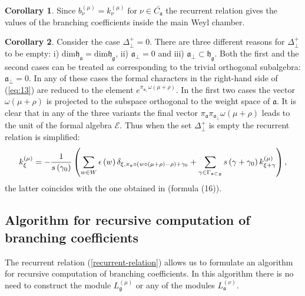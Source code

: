 \documentclass[12pt]{iopart}
\theoremstyle{definition}
\newtheorem{corollary}{Corollary}[theorem]
\theoremstyle{definition}
\theoremstyle{definition}
\begin{document}
\begin{corollary}
  Since $b^{(\mu)}_{\nu}=k^{(\mu)}_{\nu}\;\mbox{for}\;\nu\in \bar{C_{\mathfrak{a}}}$ the recurrent relation gives the values of the branching coefficients inside the main Weyl chamber.
\end{corollary}
\begin{corollary}
  Consider the case  $\Delta_{\bot}^{+} = 0$. There are three different reasons for $\Delta_{\bot}^{+}$
to be empty: i) $\mathrm{dim}\mathfrak{h}_{\mathfrak{a}}=\mathrm{dim}\mathfrak{h}_{\mathfrak{g}}$,
ii) $\mathfrak{a}_{\bot}=0$ and iii) $\mathfrak{a}_{\bot}\subset \mathfrak{h}_{\mathfrak{g}}$.
Both the first and the second cases can be treated as corresponding to the trivial orthogonal subalgebra:
$\mathfrak{a}_{\bot}=0$. In any of these cases the formal characters in the right-hand side of (\ref{eq:13})
are reduced to the element $e^{ \pi_{\mathfrak{a}_{\bot}}\omega(\mu+\rho)}$.
In the first two cases the vector $\omega(\mu+\rho)$ is projected to the subspace orthogonal to the weight space of $\mathfrak{a}$. It is clear that in any of the three variants the final vector $\pi_{\mathfrak{a}}\pi_{\mathfrak{a}_{\bot}}\omega(\mu+\rho)$ leads to the unit of the formal algebra
$\mathcal{E}$. Thus when the set $\Delta_{\bot}^{+}$ is empty the  recurrent relation is simplified:
\begin{equation*}
k_{\xi }^{\left( \mu \right) }=-\frac{1}{s\left( \gamma _{0}\right) }\left(
\sum_{w\in W}\epsilon \left( w\right) \delta _{\xi ,\pi _{\frak{a}}\circ
\left( w\circ (\mu +\rho )-\rho \right) +\gamma _{0}}+\sum_{\gamma \in
\Gamma _{\frak{a}\subset \frak{g}}}s\left( \gamma +\gamma _{0}\right) k_{\xi
+\gamma }^{\left( \mu \right) }\right),  \label{recurrent relation special}
\end{equation*}
the latter coincides with the one obtained in \cite{ilyin812pbc} (formula (16)).
\end{corollary}
\subsection{Algorithm for recursive computation of branching coefficients}
\label{sec:algorithm}

The recurrent relation (\ref{recurrent-relation}) allows us to formulate an algorithm for recursive computation of branching coefficients.
In this algorithm there is no need to  construct the module $L^{(\mu)}_{\mathfrak{g}}$ or any of the modules $L^{(\nu)}_{\mathfrak{a}}$.
\end{document}
